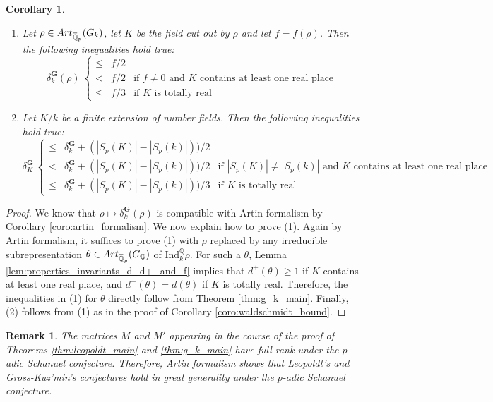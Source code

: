 \documentclass[12pt]{amsart}
\newcommand{\Q}{\mathbb{Q}}
\newcommand\bQ{\mathbb{Q}}
\newcommand{\ob}[1]{\mkern 1.5mu\overline{\mkern-1.5mu#1\mkern-1.5mu}\mkern 1.5mu}
\newcommand{\Ind}{\mathrm{Ind}}
\newcommand{\Art}{\textrm{Art}}
\theoremstyle{defstyle}
\newtheorem{remark}[subsubsection]{Remark}
\theoremstyle{thmstyle}
\newtheorem{corollaire}[subsubsection]{Corollary}
\begin{document}
	\begin{corollaire}\label{coro:gk_bound}
		\begin{enumerate}
			\item Let $\rho \in \Art_{\ob{\bQ}_p}(G_k)$, let $K$ be the field cut out by $\rho$ and let $f=f(\rho)$. Then the following inequalities hold true:
			\[\delta_k^\textbf{G}(\rho)\ \left\{\begin{array}{ccl}
				\leq &f/2 &  \\
				< &f/2 & \mbox{if $f\neq 0$ and $K$ contains at least one real place}\\
				\leq &f/3 & \mbox{if $K$ is totally real}
			\end{array}\right.
			\]
			\item Let $K/k$ be a finite extension of number fields. Then the following inequalities hold true:
			\[\delta_K^\textbf{G}\ \left\{\begin{array}{ccl}
				\leq & \delta_k^\textbf{G} + \left(|S_p(K)|-|S_p(k)|\right))/2 &  \\
				< & \delta_k^\textbf{G} + \left(|S_p(K)|-|S_p(k)|\right))/2 & \mbox{if $|S_p(K)|\neq|S_p(k)|$ and $K$ contains at least one real place}\\
				\leq & \delta_k^\textbf{G} + \left(|S_p(K)|-|S_p(k)|\right))/3 & \mbox{if $K$ is totally real}
			\end{array}\right.
			\]
		\end{enumerate} 
	\end{corollaire}
	\begin{proof}
		We know that $\rho \mapsto \delta_k^\textbf{G}(\rho)$ is compatible with Artin formalism by Corollary \ref{coro:artin_formalism}. We now explain how to prove (1). Again by Artin formalism, it suffices to prove (1) with $\rho$ replaced by any irreducible subrepresentation $\theta \in \Art_{\ob{\bQ}_p}(G_\Q)$ of $\Ind_k^\Q \rho$. For such a $\theta$, Lemma \ref{lem:properties_invariants_d_d+_and_f} implies that $d^+(\theta)\geq 1$ if $K$ contains at least one real place, and $d^+(\theta)=d(\theta)$ if $K$ is totally real. Therefore, the inequalities in (1) for $\theta$ directly follow from Theorem \ref{thm:g_k_main}. Finally, (2) follows from (1) as in the proof of Corollary \ref{coro:waldschmidt_bound}.
	\end{proof}
	\begin{remark}\label{rem:schanuel_implique_leo_et_gk}
		The matrices $M$ and $M'$ appearing in the course of the proof of Theorems \ref{thm:leopoldt_main} and \ref{thm:g_k_main} have full rank under the $p$-adic Schanuel conjecture. Therefore, Artin formalism shows that Leopoldt's and Gross-Kuz'min's conjectures hold in great generality under the $p$-adic Schanuel conjecture. 
	\end{remark}
	
\end{document}
